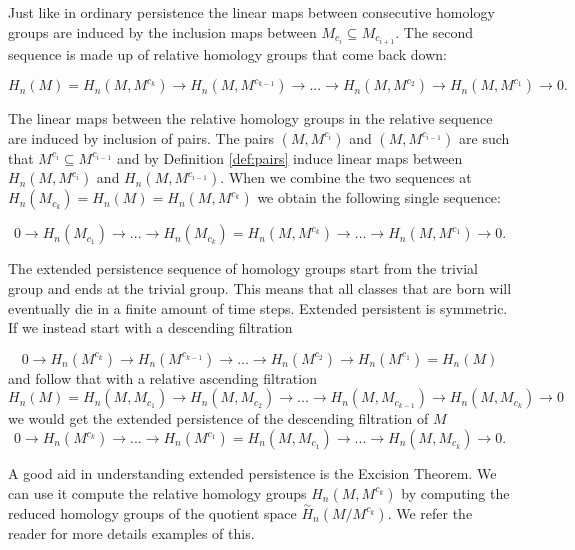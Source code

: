 Just like in ordinary persistence the linear maps between consecutive homology groups are induced by the inclusion maps between $M_{c_i} \subseteq M_{c_{i+1}}$. The second sequence is made up of relative homology groups that come back down:

$$ H_n(M) = H_n(M, M^{c_k}) \rightarrow H_n(M, M^{c_{k-1}}) \rightarrow... \rightarrow H_n(M, M^{c_{2}}) \rightarrow H_n(M, M^{c_{1}}) \rightarrow 0.$$

The linear maps between the relative homology groups in the relative sequence are induced by inclusion of pairs. The pairs $(M, M^{c_i})$ and $(M, M^{c_{i-1}})$ are such that $M^{c_i} \subseteq M^{c_{i-1}}$ and by Definition \ref{def:pairs} induce linear maps between $H_n(M, M^{c_i})$ and $H_n(M, M^{c_{i-1}})$. When we combine the two sequences at $H_n(M_{c_k}) =  H_n(M) = H_n(M, M^{c_k})$ we obtain the following single sequence:

$$ 0 \rightarrow H_n(M_{c_1}) \rightarrow ... \rightarrow H_n(M_{c_k}) = H_n(M, M^{c_k}) \rightarrow ... \rightarrow H_n(M, M^{c_{1}}) \rightarrow 0.$$

The extended persistence sequence of homology groups start from the trivial group and ends at the trivial group. This means that all classes that are born will eventually die in a finite amount of time steps. Extended persistent is symmetric. If we instead start with a descending filtration

$$ 0 \rightarrow H_n(M^{c_k}) \rightarrow H_n(M^{c_{k-1}}) \rightarrow ... \rightarrow H_n(M^{c_{2}}) \rightarrow H_n(M^{c_1}) =  H_n(M) $$
and follow that with a relative ascending filtration
$$ H_n(M) = H_n(M, M_{c_1}) \rightarrow H_n(M, M_{c_{2}}) \rightarrow... \rightarrow H_n(M, M_{c_{k-1}}) \rightarrow H_n(M, M_{c_{k}}) \rightarrow 0 $$
we would get the extended persistence of the descending filtration of $M$
$$ 0 \rightarrow H_n(M^{c_k}) \rightarrow ... \rightarrow H_n(M^{c_1}) = H_n(M, M_{c_1}) \rightarrow ... \rightarrow H_n(M, M_{c_k}) \rightarrow 0.$$

A good aid in understanding extended persistence is the Excision Theorem. We can use it compute the relative homology groups $H_n(M, M^{c_k})$ by computing the reduced homology groups of the quotient space $\overset{\sim}{H}_n(M / M^{c_k})$. We refer the reader \cite{folded-molecules} for more details examples of this.


